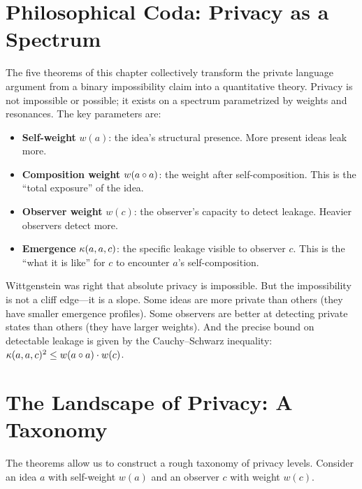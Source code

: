 \section{Philosophical Coda: Privacy as a Spectrum}

The five theorems of this chapter collectively transform the private
language argument from a binary impossibility claim into a quantitative
theory. Privacy is not impossible or possible; it exists on a spectrum
parametrized by weights and resonances. The key parameters are:

\begin{itemize}
\item \textbf{Self-weight} $w(a)$: the idea's structural presence.
More present ideas leak more.
\item \textbf{Composition weight} $w(a \circ a)$: the weight after
self-composition. This is the ``total exposure'' of the idea.
\item \textbf{Observer weight} $w(c)$: the observer's capacity to
detect leakage. Heavier observers detect more.
\item \textbf{Emergence} $\kappa(a, a, c)$: the specific leakage
visible to observer $c$. This is the ``what it is like'' for $c$
to encounter $a$'s self-composition.
\end{itemize}

Wittgenstein was right that absolute privacy is impossible. But the
impossibility is not a cliff edge---it is a slope. Some ideas are
more private than others (they have smaller emergence profiles). Some
observers are better at detecting private states than others (they
have larger weights). And the precise bound on detectable leakage is
given by the Cauchy--Schwarz inequality: $\kappa(a, a, c)^2 \leq
w(a \circ a) \cdot w(c)$.

\section{The Landscape of Privacy: A Taxonomy}

The theorems allow us to construct a rough taxonomy of privacy levels.
Consider an idea $a$ with self-weight $w(a)$ and an observer $c$ with
weight $w(c)$.

